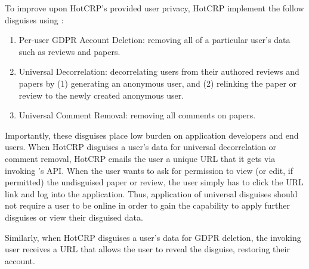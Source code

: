 To improve upon HotCRP's provided user privacy, HotCRP implement the follow disguises using \sys:
\begin{enumerate}[nosep]
    \item Per-user GDPR Account Deletion: removing all of a particular user's data such as reviews and papers.
    \item Universal Decorrelation: decorrelating users from
        their authored reviews and papers by (1) generating an
        anonymous user, and (2) relinking the paper or review
        to the newly created anonymous user.
    \item Universal Comment Removal: removing all comments on papers.
\end{enumerate}
Importantly, these disguises place low burden on application developers and end users.
%
When HotCRP disguises a user's data for universal decorrelation or comment removal, HotCRP emails
the user a unique URL that it gets via invoking \sys's API.  When the user
wants to ask for permission to view (or edit, if permitted) the undisguised paper or review, the
user simply has to click the URL link and log into the application. Thus, application of universal
disguises should not require a user to be online in order to gain the capability to apply further
disguises or view their disguised data.

Similarly, when HotCRP disguises a user's data for GDPR deletion, the invoking user receives a URL
that allows the user to reveal the disguise, restoring their account.

